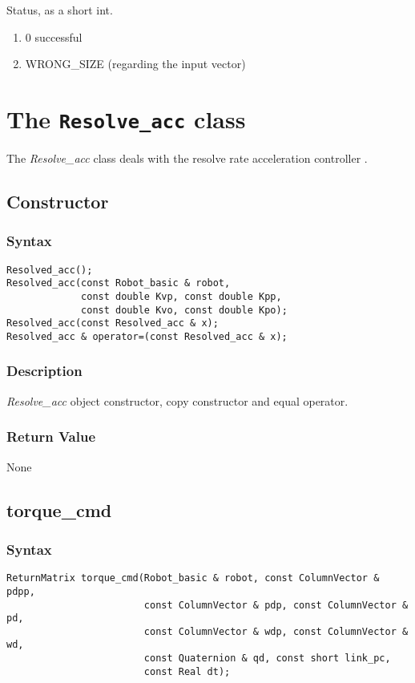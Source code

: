 \documentclass[11pt,fleqn,letterpaper]{report}
\begin{document}
Status, as a short int.
\begin{enumerate}
\item[] 0 successful
\item[] WRONG\_SIZE (regarding the input vector)
\end{enumerate}

\newpage

\section{The \texttt{Resolve\_acc} class}

The \emph{Resolve\_acc} class deals with the resolve rate acceleration
controller \cite{Caccavale98}.

\subsection*{Constructor}
\subsubsection*{Syntax}
\begin{verbatim}
Resolved_acc();
Resolved_acc(const Robot_basic & robot, 
             const double Kvp, const double Kpp, 
             const double Kvo, const double Kpo);
Resolved_acc(const Resolved_acc & x);
Resolved_acc & operator=(const Resolved_acc & x);
\end{verbatim}

\subsubsection*{Description}   
\emph{Resolve\_acc} object constructor, copy constructor and equal
operator.

\subsubsection*{Return Value}

None

\newpage

\subsection*{torque\_cmd}
\subsubsection*{Syntax}
\begin{verbatim}
ReturnMatrix torque_cmd(Robot_basic & robot, const ColumnVector & pdpp, 
                        const ColumnVector & pdp, const ColumnVector & pd, 
                        const ColumnVector & wdp, const ColumnVector & wd, 
                        const Quaternion & qd, const short link_pc, 
                        const Real dt);
\end{verbatim}
\end{document}
